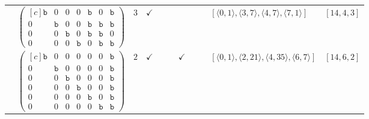 \documentclass[12pt]{article}
\theoremstyle{definition}
\theoremstyle{plain}
\begin{document}
{\begin{longtable}{@{}cYcccccccZc@{}}
\cmidrule(lr){2-11}



& $\begin{pmatrix*}[c]
\mathtt{b}   &  0    &  0    &   0  &  \mathtt{b}  &  0  &  \mathtt{b}  \\
0   &  \mathtt{b}    &  0    &   0  &  \mathtt{b}  &  \mathtt{b}  &  \mathtt{b}  \\
0   &  0    &  \mathtt{b}    &   0  &  \mathtt{b}  &  \mathtt{b}  &  0  \\
0   &  0    &  0    &   \mathtt{b}  &  0  &  \mathtt{b}  &  \mathtt{b}
\end{pmatrix*}$
& $3$
& $\checkmark$
&
&
&
&
&
& $[\langle0,1\rangle,\allowbreak\langle3,7\rangle,\allowbreak\langle4,7\rangle,\allowbreak\langle7,1\rangle]$
& $[14,4,3]$     \\


\cmidrule(lr){2-11}

& $\begin{pmatrix*}[c]
\mathtt{b}   &  0    &  0    &   0  &  0  &  0  &  \mathtt{b}  \\
0   &  \mathtt{b}    &  0    &   0  &  0  &  0  &  \mathtt{b}  \\
0   &  0    &  \mathtt{b}    &   0  &  0  &  0  &  \mathtt{b}  \\
0   &  0    &  0    &   \mathtt{b}  &  0  &  0  &  \mathtt{b}  \\
0   &  0    &  0    &   0  &  \mathtt{b}  &  0  &  \mathtt{b}  \\
0   &  0    &  0    &   0  &  0  &  \mathtt{b}  &  \mathtt{b}
\end{pmatrix*}$
& $2$
& $\checkmark$
&
&
& $\checkmark$
&
&
& $[\langle0,1\rangle,\allowbreak\langle2,21\rangle,\allowbreak\langle4,35\rangle,\allowbreak\langle6,7\rangle]$
& $[14,6,2]$     \\


\end{longtable}}
\end{document}
